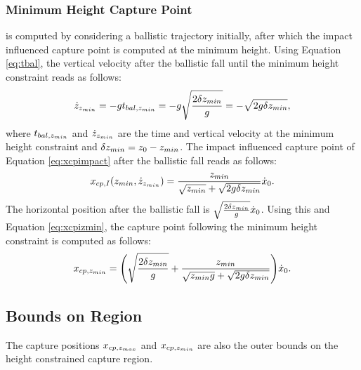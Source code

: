 \subsubsection{Minimum Height Capture Point} is computed by considering a ballistic trajectory initially, after which the impact influenced capture point is computed at the minimum height. Using Equation \eqref{eq:tbal}, the vertical velocity after the ballistic fall until the minimum height constraint reads as follows:
\begin{equation}
	\dot{z}_{z_{min}} = -gt_{bal,z_{min}} = -g\sqrt{\frac{2\delta{z_{min}}}{g}} = -\sqrt{2g\delta{z_{min}}},
\end{equation}
where $t_{bal,z_{min}}$ and $\dot{z}_{z_{min}}$ are the time and vertical velocity at the minimum height constraint and $\delta{z_{min}}=z_0-z_{min}$. The impact influenced capture point of Equation \eqref{eq:xcpimpact} after the ballistic fall reads as follows:
\begin{equation}
\label{eq:xcpizmin}
	x_{cp,I}(z_{min}, \dot{z}_{z_{min}})= \frac{z_{min}}{\sqrt{z_{min}}+\sqrt{2g\delta{z_{min}}}}\dot{x}_0.
\end{equation} 
The horizontal position after the ballistic fall is $\sqrt{\frac{2\delta z_{min}}{g}}\dot{x}_0$. Using this and Equation \eqref{eq:xcpizmin}, the capture point following the minimum height constraint is computed as follows:
\begin{equation}
 x_{cp,z_{min}}=\Bigg(\sqrt{\frac{2\delta{z_{min}}}{g}} +\frac{z_{min}}{\sqrt{z_{min} g}+\sqrt{2g\delta{z_{min}}}}\Bigg)\dot{x}_0.
\end{equation}

\subsection{Bounds on Region}
The capture positions $x_{cp,z_{max}}$ and $x_{cp,z_{min}}$ are also the outer bounds on the height constrained capture region.

